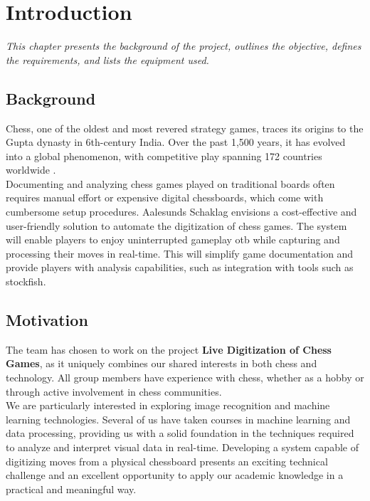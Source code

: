 \chapter{Introduction}

\begin{center} 
\textit{This chapter presents the background of the project, outlines the objective, defines the requirements, and lists the equipment used.}
\end{center}


\section{Background}

Chess, one of the oldest and most revered strategy games, traces its origins to the Gupta dynasty in 6th-century India. Over the past 1,500 years, it has evolved into a global phenomenon, with competitive play spanning 172 countries worldwide \cite{artsnculture}. \\

Documenting and analyzing chess games played on traditional boards often requires manual effort or expensive digital chessboards, which come with cumbersome setup procedures. Aalesunds Schaklag envisions a cost-effective and user-friendly solution to automate the digitization of chess games.  The system will enable players to enjoy uninterrupted gameplay \gls{otb} while capturing and processing their moves in real-time. This will simplify game documentation and provide players with analysis capabilities, such as integration with tools such as \gls{stockfish}.

\section{Motivation}

The team has chosen to work on the project \textbf{Live Digitization of Chess Games}, as it uniquely combines our shared interests in both chess and technology. All group members have experience with chess, whether as a hobby or through active involvement in chess communities. \\

We are particularly interested in exploring image recognition and machine learning technologies. Several of us have taken courses in machine learning and data processing, providing us with a solid foundation in the techniques required to analyze and interpret visual data in real-time. Developing a system capable of digitizing moves from a physical chessboard presents an exciting technical challenge and an excellent opportunity to apply our academic knowledge in a practical and meaningful way.

